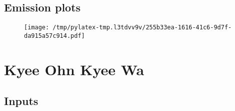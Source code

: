 \documentclass{article}%
\begin{document}
\subsection{Emission plots}%
\label{subsec:Emissionplots}%


\begin{figure}[htbp]%
\centering%
\texttt{[image: /tmp/pylatex-tmp.l3tdvv9v/255b33ea-1616-41c6-9d7f-da915a57c914.pdf]}%
\end{figure}

%
\section{Kyee Ohn Kyee Wa}%
\label{sec:KyeeOhnKyeeWa}%
\subsection{Inputs}%
\label{subsec:Inputs}%
\end{document}
